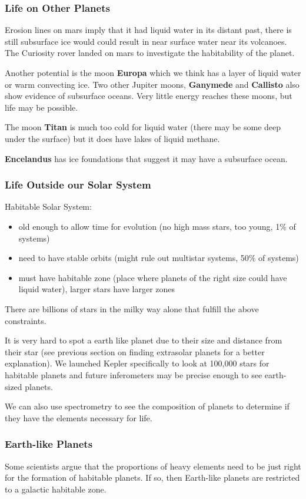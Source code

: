 \documentclass[12pt]{article}
\begin{document}
\subsubsection{Life on Other Planets}
Erosion lines on mars imply that it had liquid water in its distant past, there is still subsurface ice would could result in near surface water near its volcanoes. The Curiosity rover landed on mars to investigate the habitability of the planet.

Another potential is the moon \textbf{Europa} which we think has a layer of liquid water or warm convecting ice. Two other Jupiter moons, \textbf{Ganymede} and \textbf{Callisto} also show evidence of subsurface oceans. Very little energy reaches these moons, but life may be possible.

The moon \textbf{Titan} is much too cold for liquid water (there may be some deep under the surface) but it does have lakes of liquid methane.

\textbf{Encelandus} has ice foundations that suggest it may have a subsurface ocean.

\subsubsection{Life Outside our Solar System}
Habitable Solar System:
\begin{itemize}
\item old enough to allow time for evolution (no high mass stars, too young, 1\% of systems)
\item need to have stable orbits (might rule out multistar systems, 50\% of systems)
\item must have habitable zone (place where planets of the right size could have liquid water), larger stars have larger zones
\end{itemize}
There are billions of stars in the milky way alone that fulfill the above constraints.

It is very hard to spot a earth like planet due to their size and distance from their star (see previous section on finding extrasolar planets for a better explanation). We launched Kepler specifically to look at 100,000 stars for habitable planets and future inferometers may be precise enough to see earth-sized planets.

We can also use spectrometry to see the composition of planets to determine if they have the elements necessary for life.

\subsubsection{Earth-like Planets}
Some scientists argue that the proportions of heavy elements need to be just right for the formation of habitable planets. If so, then Earth-like planets are restricted to a galactic habitable zone.
\end{document}
